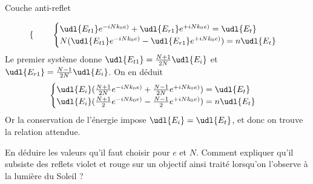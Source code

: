 \begin{exo}[PC][2][TD]{Couche anti-reflet}
\begin{quest}
{$$\begin{cases}
\end{cases}\qquad
\begin{cases}
\udl{E_{t1}} e^{-i N k_0 e)} + \udl{E_{r1}} e^{+i N k_0 e)} = \udl{E_{t}}\\
N(\udl{E_{t1}} e^{-i N k_0 e)} - \udl{E_{r1}} e^{+i N k_0 e)}) = n\udl{E_{t}} \\
\end{cases}
$$
Le premier système donne $\udl{E_{t1}}=\frac{N+1}{2N}\udl{E_{i}}$ et $\udl{E_{r1}}=\frac{N-1}{2N}\udl{E_{i}}$. On en déduit
$$
\begin{cases}
\udl{E_{i}}(\frac{N+1}{2N} e^{-i N k_0 e)} + \frac{N-1}{2N} e^{+i N k_0 e)}) = \udl{E_{t}}\\
\udl{E_{i}}(\frac{N+1}{2} e^{-i N k_0 e)} - \frac{N-1}{2} e^{+i N k_0 e)}) = n\udl{E_{t}} \\
\end{cases}
$$
Or la conservation de l'énergie impose $\udl{E_{i}} = \udl{E_{t}}$, et donc on trouve la relation attendue.
}
\item En déduire les valeurs qu'il faut choisir pour $e$ et $N$. Comment expliquer qu'il subsiste des reflets violet et rouge sur un objectif ainsi traité lorsqu'on l'observe à la lumière du Soleil ?
\end{quest}
\end{exo}

